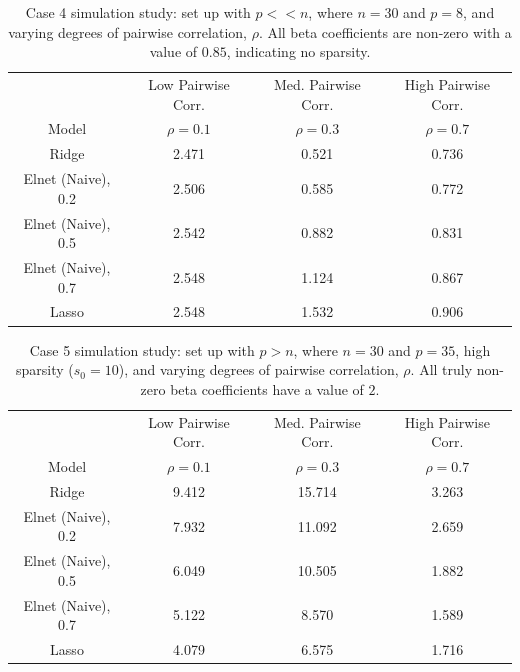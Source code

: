 \begin{table}[H]
\centering
\begin{tabular}{||c c c c||} 
\hline
& Low Pairwise Corr. & Med. Pairwise Corr. & High Pairwise Corr. \\ [0.5ex] 
Model & $\rho=0.1$ & $\rho=0.3$ & $\rho=0.7$\\ [0.5ex]
\hline\hline
Ridge & \cellcolor{pink!60}2.471 & \cellcolor{pink!60}0.521 & \cellcolor{pink!60}0.736\\ 
\hline
Elnet (Naive), 0.2 & 2.506 & 0.585 & 0.772\\
\hline
Elnet (Naive), 0.5 & 2.542 & 0.882 & 0.831\\
\hline
Elnet (Naive), 0.7 & 2.548 & 1.124 & 0.867\\
\hline
Lasso & 2.548 & 1.532 & 0.906\\
\hline
\end{tabular}
\caption[Case 4 simulation study]{Case 4 simulation study: set up with $p<<n$, where $n=30$ and $p=8$, and varying degrees of pairwise correlation, $\rho$. All beta coefficients are non-zero with a value of $0.85$, indicating no sparsity.}
\label{tab:case4}
\end{table}

\begin{table}[H]
\centering
\begin{tabular}{||c c c c||} 
\hline
& Low Pairwise Corr. & Med. Pairwise Corr. & High Pairwise Corr. \\ [0.5ex] 
Model & $\rho=0.1$ & $\rho=0.3$ & $\rho=0.7$\\ [0.5ex]
\hline\hline
Ridge & 9.412 & 15.714 & 3.263\\ 
\hline
Elnet (Naive), 0.2 & 7.932 & 11.092 & 2.659\\
\hline
Elnet (Naive), 0.5 & 6.049 & 10.505 & 1.882\\
\hline
Elnet (Naive), 0.7 & 5.122 & 8.570 & \cellcolor{pink!60}1.589 \\
\hline
Lasso & \cellcolor{pink!60}4.079 & \cellcolor{pink!60}6.575 & 1.716 \\
\hline
\end{tabular}
\caption[Case 5 simulation study]{Case 5 simulation study: set up with $p>n$, where $n=30$ and $p=35$, high sparsity ($s_0=10$), and varying degrees of pairwise correlation, $\rho$. All truly non-zero beta coefficients have a value of $2$.}
\label{tab:case5}
\end{table}

